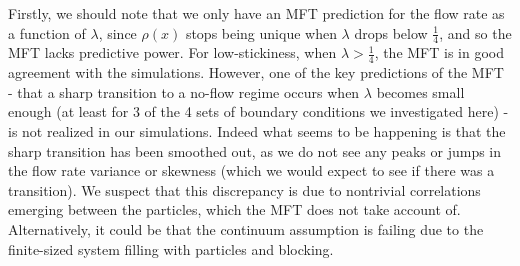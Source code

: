 Firstly, we should note that we only have an MFT prediction for the flow rate as a function of $\lambda$, since $\rho(x)$ stops being unique when $\lambda$ drops below $\frac{1}{4}$,
and so the MFT lacks predictive power. For low-stickiness, when $\lambda>\frac{1}{4}$, the MFT is in good agreement with the simulations.
However, one of the key predictions of the MFT - that a sharp transition to a no-flow regime occurs when $\lambda$ becomes small enough (at least for 3 of the 4 sets of
boundary conditions we investigated here) - is not realized in our simulations. Indeed what seems to be happening is that the sharp transition has been smoothed out, as we
do not see any peaks or jumps in the flow rate variance or skewness (which we would expect to see if there was a transition). We suspect that this discrepancy is due to nontrivial correlations emerging between the particles, which the MFT
does not take account of. Alternatively, it could be that the continuum assumption is failing due to the finite-sized system filling with particles and blocking.

